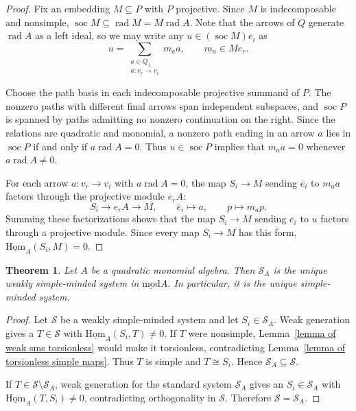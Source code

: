 \documentclass[11pt]{article}
\newcommand{\soc}{\operatorname{soc}}
\newcommand{\rad}{\operatorname{rad}}
\newcommand{\smod}{\operatorname{\underline{mod}}}
\newcommand{\sHom}{\operatorname{\underline{Hom}}}
\newtheorem{theorem}{Theorem}[section]
\theoremstyle{definition}
\begin{document}
		\begin{proof}
			Fix an embedding $M\subseteq P$ with $P$ projective. Since $M$ is indecomposable and nonsimple, $\soc M\subseteq\rad M=M\rad A$. Note that the arrows of $Q$ generate $\rad A$ as a left ideal, so we may write any $u\in(\soc M)e_i$ as
\[
    u=\sum_{\substack{a\in Q_1\\a:v_r\to v_i}}m_a a,
    \qquad m_a\in Me_r.
\]

			Choose the path basis in each indecomposable projective summand of $P$. The nonzero paths with different final arrows span independent subspaces, and $\soc P$ is spanned by paths admitting no nonzero continuation on the right.
			Since the relations are quadratic and monomial, a nonzero path ending in an arrow $a$ lies in $\soc P$ if and only if $a\rad A=0$. Thus $u\in\soc P$ implies that $m_a a=0$ whenever $a\rad A\ne0$.

			For each arrow $a:v_r\to v_i$ with $a\rad A=0$, the map $S_i\to M$ sending $\overline e_i$ to $m_a a$ factors through the projective module $e_rA$:
			\[
				S_i\longrightarrow e_rA\longrightarrow M,
				\qquad
				\overline e_i\longmapsto a,\qquad p\longmapsto m_a p.
			\]
			Summing these factorizations shows that the map $S_i\to M$ sending $\overline e_i$ to $u$ factors through a projective module. Since every map $S_i\to M$ has this form, $\sHom_A(S_i,M)=0$.
		\end{proof}

		\begin{theorem}\label{theorem of quadratic monomial sms}
			Let $A$ be a quadratic monomial algebra. Then $\mathcal S_A$ is the unique weakly simple-minded system in $\smod A$. In particular, it is the unique simple-minded system.
		\end{theorem}

		\begin{proof}
			Let $\mathcal S$ be a weakly simple-minded system and let $S_i\in\mathcal S_A$. Weak generation gives a $T\in\mathcal S$ with $\sHom_A(S_i,T)\ne0$. If $T$ were nonsimple, Lemma~\ref{lemma of weak sms torsionless} would make it torsionless, contradicting Lemma~\ref{lemma of torsionless simple maps}. Thus $T$ is simple and $T\cong S_i$. Hence $\mathcal S_A\subseteq\mathcal S$.

			If $T\in\mathcal S\setminus\mathcal S_A$, weak generation for the standard system $\mathcal S_A$ gives an $S_i\in\mathcal S_A$ with $\sHom_A(T,S_i)\ne0$, contradicting orthogonality in $\mathcal S$. Therefore $\mathcal S=\mathcal S_A$.
		\end{proof}
\end{document}
